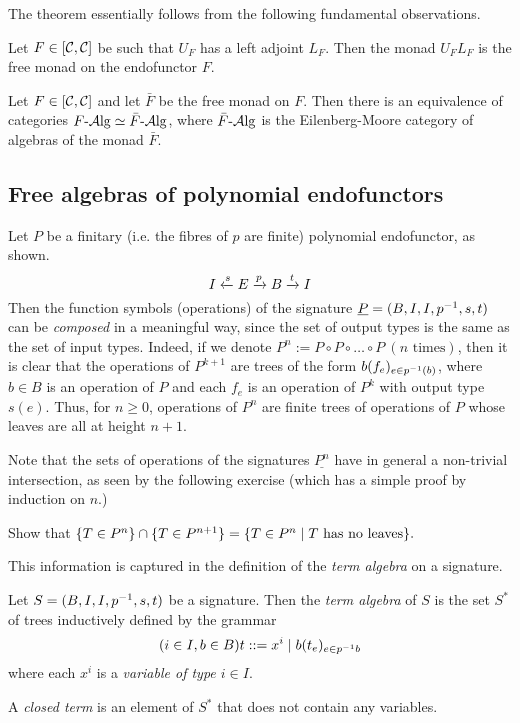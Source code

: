 The theorem essentially follows from the following fundamental observations.
\begin{proposition}
    Let $F\in\left[\mathcal{C},\mathcal{C}\right]$ be such that $U_F$ has a left adjoint $L_F$. Then the
    monad $U_FL_F$ is the free monad on the endofunctor $F$.
\end{proposition}

\begin{proposition}
    Let $F\in\left[\mathcal{C},\mathcal{C}\right]$ and let $\bar{F}$ be the free monad on $F$. Then
    there is an equivalence of categories $F{\text{-} \mathrm{\mathcal{A} lg}}\simeq\bar{F}{\text{-} \mathrm{\mathcal{A} lg}}$, where
    $\bar{F}{\text{-} \mathrm{\mathcal{A} lg}}$ is the Eilenberg-Moore category of algebras of the monad
    $\bar{F}$.
\end{proposition}
\subsection{Free algebras of polynomial endofunctors}
Let $P$ be a finitary (i.e. the fibres of $p$ are finite) polynomial
endofunctor, as shown.
\[
    I\xleftarrow {s} E\xrightarrow {p} B\xrightarrow {t} I
\]
Then the function symbols (operations) of the signature
$\underline{P}=(B,I,I,p^{-1},s,t)$ can be \emph{composed} in a meaningful way,
since the set of output types is the same as the set of input types. Indeed, if
we denote $P^n:=P\circ P\circ\ldots\circ P \ (n \text{ times})$, then it is
clear that the operations of $P^{k+1}$ are trees of the form $b(f_e)_{e\in p^{-1}(b)}$,
where $b\in B$ is an operation of $P$ and each $f_e$ is an operation of $P^k$
with output type $s(e)$. Thus, for $n\geq 0$, operations of $P^n$ are finite
trees of operations of $P$ whose leaves are all at height $n+1$.

Note that the sets of operations of the signatures $\underline{P^n}$ have in
general a non-trivial intersection, as seen by the following exercise (which has
a simple proof by induction on $n$.)
\begin{exercise} Show that
        $\{ T\in P^n \} \cap \{ T\in P^{n+1} \} = \{ T\in P^n \mid T \text{ has
          no leaves} \}.$
\end{exercise}

This information is captured in the definition of the \emph{term algebra} on a
signature.
\begin{definition}
    Let $S=(B,I,I,p^{-1},s,t)$ be a signature. Then the \emph{term algebra} of
    $S$ is the set $S^*$ of trees inductively defined by the grammar
    \[
        (i\in I,b\in B) t ::= x^i \mid b(t_e)_{e\in p^{-1} b}
    \]
    where each $x^i$ is a \emph{variable of type $i\in I$}.

    A \emph{closed term} is an element of $S^*$ that does not contain any variables.
\end{definition}

